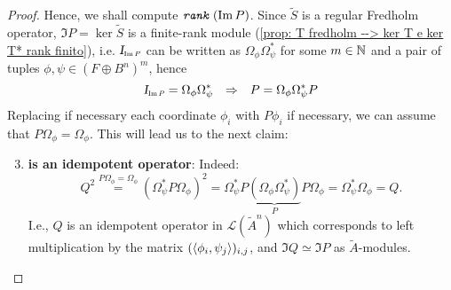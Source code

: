 \begin{proposicao}
\begin{proof}
Hence, we shall compute $\texttt{\textit{rank}}\,(\operatorname{Im} P)$. Since $\widetilde S$ is a regular Fredholm operator, $\Im P = \ker \widetilde S $ is a finite-rank module (\ref{prop: T fredholm --> ker T e ker T* rank finito}), i.e. $\sub \Id{\Im P}$ can be written as $\Omega_\phi^{\,}\Omega_\psi^*$ for some $m\in \operatorname{\mathbb{N}}$ and a pair of tuples $\phi, \psi \in (F \oplus B^n)^m$, hence
    \[
    \sub\Id{\Im P} = \Omega_{\phi}\Omega_{\psi}^* \To P = \Omega_{\phi}\Omega_{\psi}^*P
    \]
Replacing if necessary each coordinate $\phi_i$ with $P\phi_i$ if necessary, we can assume that $P\Omega_\phi = \Omega_\phi$. This will lead us to the next claim:
\begin{enumerate}[label=\ensuremath{(\roman*)}]
    \setcounter{enumi}{2}
    \item \textbf{ is an idempotent operator}: Indeed:
    \begin{equation*}
        Q^2 \overset{P\Omega_\phi = \Omega_\phi}= (\Omega_{\psi}^*P\Omega_\phi^{\,})^2 =  \Omega_{\psi}^* P\underbrace{(\Omega_{\phi} \Omega_{\psi}^*)}_P P\Omega_{\phi} = \Omega_{\psi}^*\Omega_{\phi}^{\,} = Q.
    \end{equation*}
    I.e., $Q$ is an idempotent operator in $\mathscr L(\widetilde{A}^n)$ which corresponds to left multiplication by the matrix $(\langle {\phi_i},{\psi_j}\rangle)_{i,j}$, and $\Im Q \simeq \Im P$ as $\widetilde{A}$-modules.


\end{enumerate}
\end{proof}
\end{proposicao}
